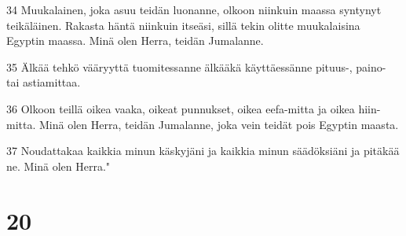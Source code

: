 \par 34 Muukalainen, joka asuu teidän luonanne, olkoon niinkuin maassa syntynyt teikäläinen. Rakasta häntä niinkuin itseäsi, sillä tekin olitte muukalaisina Egyptin maassa. Minä olen Herra, teidän Jumalanne.
\par 35 Älkää tehkö vääryyttä tuomitessanne älkääkä käyttäessänne pituus-, paino- tai astiamittaa.
\par 36 Olkoon teillä oikea vaaka, oikeat punnukset, oikea eefa-mitta ja oikea hiin-mitta. Minä olen Herra, teidän Jumalanne, joka vein teidät pois Egyptin maasta.
\par 37 Noudattakaa kaikkia minun käskyjäni ja kaikkia minun säädöksiäni ja pitäkää ne. Minä olen Herra."

\chapter{20}

